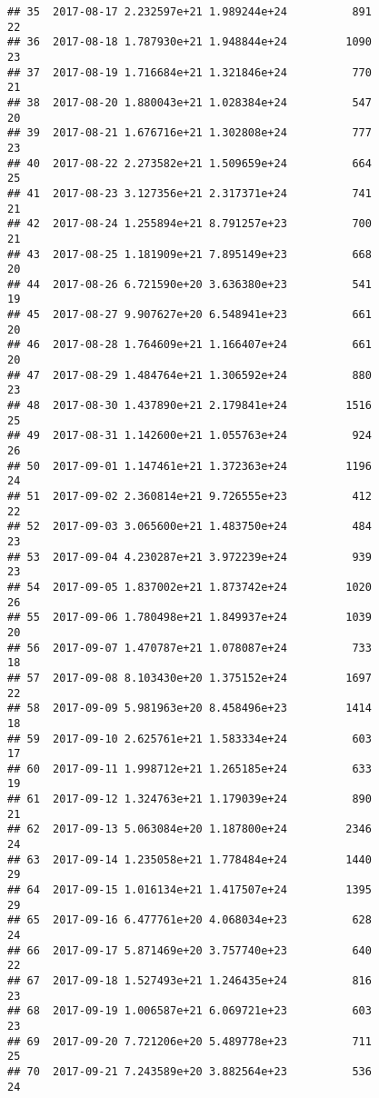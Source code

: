 \documentclass[]{article}
\begin{document}
\begin{verbatim}
## 35  2017-08-17 2.232597e+21 1.989244e+24          891              22
## 36  2017-08-18 1.787930e+21 1.948844e+24         1090              23
## 37  2017-08-19 1.716684e+21 1.321846e+24          770              21
## 38  2017-08-20 1.880043e+21 1.028384e+24          547              20
## 39  2017-08-21 1.676716e+21 1.302808e+24          777              23
## 40  2017-08-22 2.273582e+21 1.509659e+24          664              25
## 41  2017-08-23 3.127356e+21 2.317371e+24          741              21
## 42  2017-08-24 1.255894e+21 8.791257e+23          700              21
## 43  2017-08-25 1.181909e+21 7.895149e+23          668              20
## 44  2017-08-26 6.721590e+20 3.636380e+23          541              19
## 45  2017-08-27 9.907627e+20 6.548941e+23          661              20
## 46  2017-08-28 1.764609e+21 1.166407e+24          661              20
## 47  2017-08-29 1.484764e+21 1.306592e+24          880              23
## 48  2017-08-30 1.437890e+21 2.179841e+24         1516              25
## 49  2017-08-31 1.142600e+21 1.055763e+24          924              26
## 50  2017-09-01 1.147461e+21 1.372363e+24         1196              24
## 51  2017-09-02 2.360814e+21 9.726555e+23          412              22
## 52  2017-09-03 3.065600e+21 1.483750e+24          484              23
## 53  2017-09-04 4.230287e+21 3.972239e+24          939              23
## 54  2017-09-05 1.837002e+21 1.873742e+24         1020              26
## 55  2017-09-06 1.780498e+21 1.849937e+24         1039              20
## 56  2017-09-07 1.470787e+21 1.078087e+24          733              18
## 57  2017-09-08 8.103430e+20 1.375152e+24         1697              22
## 58  2017-09-09 5.981963e+20 8.458496e+23         1414              18
## 59  2017-09-10 2.625761e+21 1.583334e+24          603              17
## 60  2017-09-11 1.998712e+21 1.265185e+24          633              19
## 61  2017-09-12 1.324763e+21 1.179039e+24          890              21
## 62  2017-09-13 5.063084e+20 1.187800e+24         2346              24
## 63  2017-09-14 1.235058e+21 1.778484e+24         1440              29
## 64  2017-09-15 1.016134e+21 1.417507e+24         1395              29
## 65  2017-09-16 6.477761e+20 4.068034e+23          628              24
## 66  2017-09-17 5.871469e+20 3.757740e+23          640              22
## 67  2017-09-18 1.527493e+21 1.246435e+24          816              23
## 68  2017-09-19 1.006587e+21 6.069721e+23          603              23
## 69  2017-09-20 7.721206e+20 5.489778e+23          711              25
## 70  2017-09-21 7.243589e+20 3.882564e+23          536              24

\end{verbatim}
\end{document}
